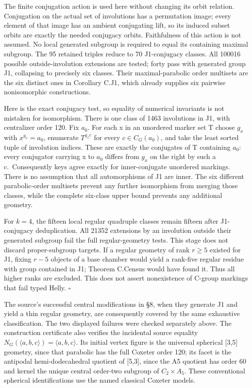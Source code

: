 The finite conjugation action is used here without changing its orbit
relation. Conjugation on the actual set of involutions has a permutation
image; every element of that image has an ambient conjugating lift, so
its induced subset orbits are exactly the needed conjugacy orbits.
Faithfulness of this action is not assumed. No local generated subgroup
is required to equal its containing maximal subgroup. The 95 retained
triples reduce to 70 J1-conjugacy classes. All 100016 possible
outside-involution extensions are tested; forty pass with generated
group J1, collapsing to precisely six classes. Their maximal-parabolic
order multisets are the six distinct ones in Corollary C.J1, which
already supplies six pairwise nonisomorphic constructions.

Here is the exact conjugacy test, so equality of numerical invariants is
not mistaken for isomorphism. There is one class of 1463 involutions in
J1, with centralizer order 120. Fix \(a_{0}\). For each x in an
unordered marker set T choose \(g_x\) with \(x^{g_x}=a_{0}\), enumerate
\(T^{g_xc}\) for every \(c\in C_G(a_{0})\), and take the least sorted
tuple of involution indices. These are exactly the conjugates of T
containing \(a_{0}\): every conjugator carrying x to \(a_{0}\) differs
from \(g_x\) on the right by such a c.~Consequently keys agree exactly
for inner-conjugate unordered markings. There is no assumption that all
automorphisms of J1 are inner. The six different parabolic-order
multisets prevent any further isomorphism from merging those classes,
while the complete six-class upper bound prevents any additional
geometry.

For \(k=4\), the fifteen local regular quadruple classes remain fifteen
after J1-conjugacy deduplication. All 21352 extensions by an involution
outside their generated subgroup fail the full regular-geometry tests.
This stage does not discard proper-subgroup targets. If a regular
geometry of rank \(r\ge 5\) existed for J1, fixing \(r-5\) objects of a
base chamber would yield a rank-five regular residue with group
contained in J1; Theorem C.Census would have found it. Thus all higher
ranks are excluded. This does not assert nonexistence of C-group
markings that fail typed Helly. \(\square\)

The source's successful central modifications in §8, when they generate
J1 and yield a thin regular geometry, are consequently covered by the
same exhaustive classification. The two displayed failures were checked
separately above. The construction certificate also verifies the
incidental source equality
\(N_G(\langle a,b,c\rangle )=\langle a,b,c\rangle\). Its initial vertex
figure is the universal spherical {[}3,5{]} geometry, since that
parabolic has the full Coxeter order 120; its facet is the antipodal
hemi-dodecahedral quotient of {[}5,3{]}, since the A5 quotient has order
60 and kernel the unique central order-two subgroup of
\(C_{2}\times A_{5}\). These conventional spherical identifications use
the named classical Coxeter models.
